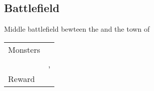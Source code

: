 \subsection{Battlefield}
\label{map:battlefield_13}

Middle battlefield bewteen the  and the town of 

\noindent\begin{tabularx}{\textwidth}[l]{lX}
	Monsters
	& \nameref{monster:sting_rat} \\
	& \nameref{monster:sting_rat}, \nameref{monster:jelly}
\\ \hline
	Reward & \nameref{item:gemini_crest}
\end{tabularx}
